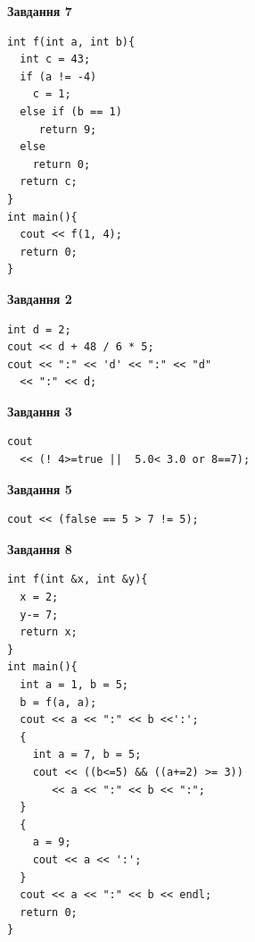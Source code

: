 \documentclass[12pt, ukrainian]{article}
\begin{document}
{\begin {large}
\begin{minipage}[t]{7.0cm}
\begin{center}
\textbf{Завдання 7}
\end{center}
\vspace{-8mm}

\begin{verbatim}
int f(int a, int b){
  int c = 43;
  if (a != -4)
    c = 1;
  else if (b == 1)
     return 9;
  else
    return 0;
  return c;
}
int main(){
  cout << f(1, 4);
  return 0;
}
\end{verbatim}

\end{minipage}
\vline \hspace{1mm}
\begin{minipage}[t]{11.0cm}

\begin{center}
\textbf{Завдання 2}
\end{center}
\vspace{-8mm}

\begin{verbatim}
int d = 2;
cout << d + 48 / 6 * 5;
cout << ":" << 'd' << ":" << "d" 
  << ":" << d;
\end{verbatim}



\begin{center}
\textbf{Завдання 3}
\end{center}
\vspace{-8mm}

\begin{verbatim}
cout 
  << (! 4>=true ||  5.0< 3.0 or 8==7);
\end{verbatim}



\begin{center}
\textbf{Завдання 5}
\end{center}
\vspace{-8mm}

\begin{verbatim}
cout << (false == 5 > 7 != 5);
\end{verbatim}



\begin{center}
\textbf{Завдання 8}
\end{center}
\vspace{-8mm}

\begin{verbatim}
int f(int &x, int &y){
  x = 2;
  y-= 7;
  return x;
}
int main(){
  int a = 1, b = 5;
  b = f(a, a);
  cout << a << ":" << b <<':';
  {
    int a = 7, b = 5;
    cout << ((b<=5) && ((a+=2) >= 3))
       << a << ":" << b << ":";
  }
  {
    a = 9;
    cout << a << ':';
  }
  cout << a << ":" << b << endl;
  return 0;
}
\end{verbatim}


\end{minipage}
\end{large}}
\end{document}
